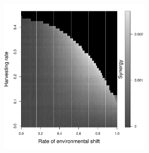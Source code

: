 \documentclass[12pt,english]{article}
\begin{document}
\begin{spacing}{1.9}
\begin{figure}[htbp]
\caption{%
}

\label{baseline}
\end{figure}

\pagebreak

\begin{figure}[htbp]
\begin{center}
\includegraphics[width=3in]{plots/synergy.pdf}
\caption{
}
\label{Synergy}
\end{center}
\end{figure}

\pagebreak



\pagebreak

\begin{figure}[htbp]


\end{figure}
\end{spacing}
\end{document}
